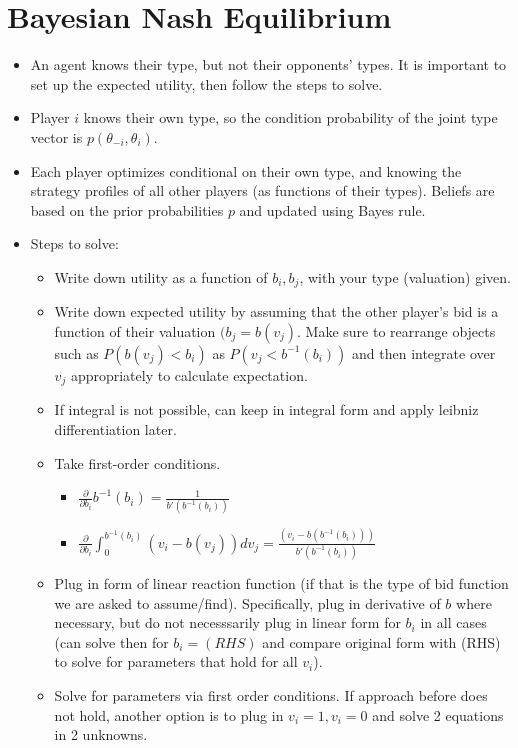 \documentclass[11pt]{article} %
\begin{document}
\section{Bayesian Nash Equilibrium}
\begin{itemize}
\item An agent knows their type, but not their opponents' types. It is important to set up the expected utility, then follow the steps to solve.
\item Player $i$ knows their own type, so the condition probability of the joint type vector is $p(\theta_{-i},\theta_i)$.
\item Each player optimizes conditional on their own type, and knowing the strategy profiles of all other players (as functions of their types). Beliefs are based on the prior probabilities $p$ and updated using Bayes rule.
\item Steps to solve:
\begin{itemize}
\item Write down utility as a function of $b_i,b_j$, with your type (valuation) given.
\item Write down expected utility by assuming that the other player's bid is a function of their valuation $(b_j = b(v_j)$. Make sure to rearrange objects such as $P(b(v_j)<b_i)$ as $P(v_j<b^{-1}(b_i))$ and then integrate over $v_j$ appropriately to calculate expectation.
\item If integral is not possible, can keep in integral form and apply leibniz differentiation later.
\item Take first-order conditions.
\begin{itemize}
\item $\frac{\partial}{\partial b_i} b^{-1}(b_i) = \frac{1}{b'(b^{-1}(b_i))}$
\item $\frac{\partial}{\partial b_i} \int_{0}^{b^{-1}(b_i)}(v_i - b(v_j))dv_j = \frac{(v_i - b(b^{-1}(b_i)))}{b'(b^{-1}(b_i))}$
\end{itemize}
\item Plug in form of linear reaction function (if that is the type of bid function we are asked to assume/find). Specifically, plug in derivative of $b$ where necessary, but do not necesssarily plug in linear form for $b_i$ in all cases (can solve then for $b_i = (RHS)$ and compare original form with (RHS) to solve for parameters that hold for all $v_i$). 
\item Solve for parameters via first order conditions. If approach before does not hold, another option is to plug in $v_i = 1, v_i = 0$ and solve 2 equations in 2 unknowns.
\end{itemize}
\end{itemize}
\end{document}
